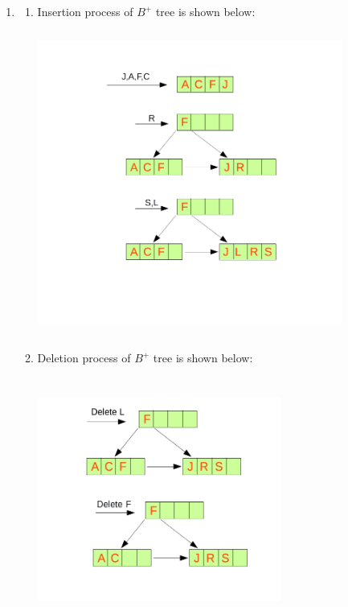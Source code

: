 \documentclass[11pt]{article}
\begin{document}
\begin{enumerate}
\item
  \begin{enumerate}
  \item Insertion process of $B^+$ tree is shown below:
    \begin{center}
    \includegraphics[width=10cm,height=10cm]{cs460-hw1-Q13-a.png}
    \end{center}

  \item Deletion process of $B^+$ tree is shown below:
    \begin{center}
      \includegraphics[width=8cm,height=8cm]{cs460-hw1-Q13-b.png}
    \end{center}
  \end{enumerate}

\end{enumerate}
\end{document}
